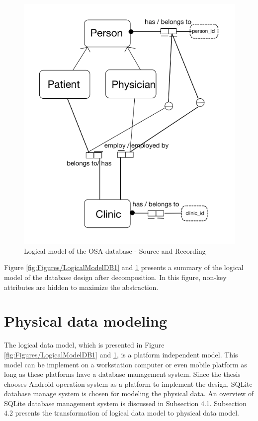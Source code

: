\begin{figure}[ht]
    \centering
    \includegraphics[width=1.0\textwidth]{Figures/LogicalModelDB2.png}
    \caption{Logical model of the OSA database - Source and Recording}
    \label{fig:Figures/LogicalModelDB2}
\end{figure}
Figure \ref{fig:Figures/LogicalModelDB1} and \ref{fig:Figures/LogicalModelDB2} presents a summary of the logical model of the database design after decomposition. In this figure, non-key attributes are hidden to maximize the abstraction.
\section{Physical data modeling}
The logical data model, which is presented in Figure \ref{fig:Figures/LogicalModelDB1} and \ref{fig:Figures/LogicalModelDB2}, is a platform independent model. This model can be implement on a workstation computer or even mobile platform as long as these platforms have a database management system. Since the thesis chooses Android operation system as a platform to implement the design, SQLite database manage system is chosen for modeling the physical data. An overview of SQLite database management system is discussed in Subsection 4.1. Subsection 4.2 presents the transformation of logical data model to physical data model.
